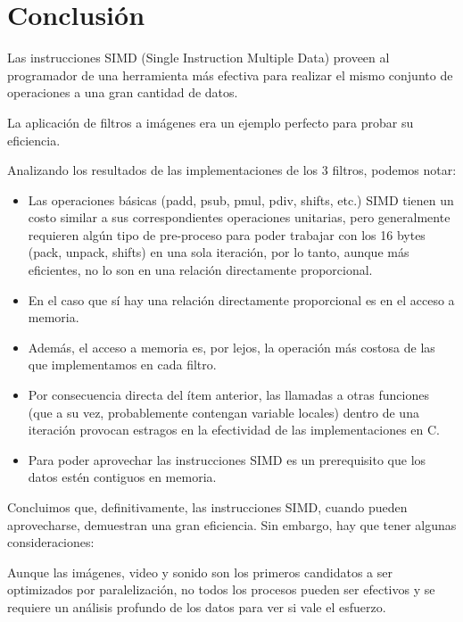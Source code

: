 \documentclass[a4paper,10pt,twoside]{article}
\begin{document}
%




\newpage
\section{Conclusión}

Las instrucciones SIMD (Single Instruction Multiple Data) proveen al programador de una herramienta más efectiva para realizar el mismo conjunto de operaciones a una gran cantidad de datos.

La aplicación de filtros a imágenes era un ejemplo perfecto para probar su eficiencia.

Analizando los resultados de las implementaciones de los 3 filtros, podemos notar:

\begin{itemize}
\item Las operaciones básicas (padd, psub, pmul, pdiv, shifts, etc.) SIMD tienen un costo similar a sus correspondientes operaciones unitarias, pero generalmente requieren algún tipo de pre-proceso para poder trabajar con los 16 bytes (pack, unpack, shifts) en una sola iteración, por lo tanto, aunque más eficientes, no lo son en una relación directamente proporcional.
\item En el caso que sí hay una relación directamente proporcional es en el acceso a memoria.
\item Además, el acceso a memoria es, por lejos, la operación más costosa de las que implementamos en cada filtro.
\item Por consecuencia directa del ítem anterior, las llamadas a otras funciones (que a su vez, probablemente contengan variable locales) dentro de una iteración provocan estragos en la efectividad de las implementaciones en C.
\item Para poder aprovechar las instrucciones SIMD es un prerequisito que los datos estén contiguos en memoria.
\end{itemize}

Concluimos que, definitivamente, las instrucciones SIMD, cuando pueden aprovecharse, demuestran una gran eficiencia. Sin embargo, hay que tener algunas consideraciones:

Aunque las imágenes, video y sonido son los primeros candidatos a ser optimizados por paralelización, no todos los procesos pueden ser efectivos y se requiere un análisis profundo de los datos para ver si vale el esfuerzo.
\end{document}

